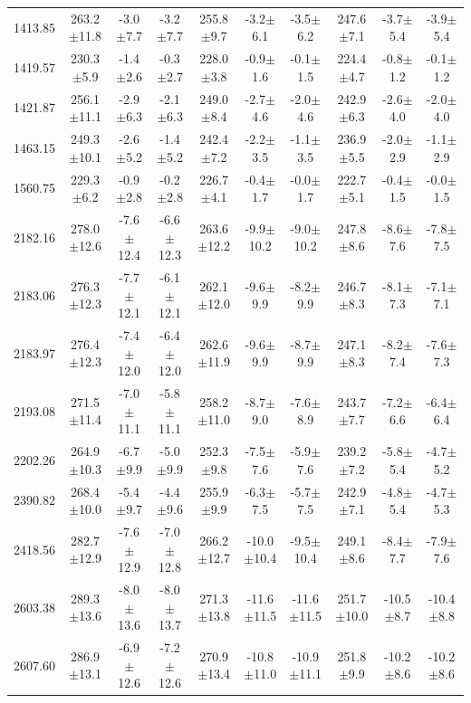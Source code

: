 \documentclass[agupp]{aguplus}              %
\begin{document}
\begin{article}
\begin{center}
\begin{table}[ht]
{\begin{tabular}{c|ccc|ccc|ccc}
1413.85 & 263.2$\pm$11.8 & -3.0$\pm$7.7 & -3.2$\pm$7.7 & 255.8$\pm$9.7 & -3.2$\pm$6.1 & -3.5$\pm$6.2 & 247.6$\pm$7.1 & -3.7$\pm$5.4 & -3.9$\pm$5.4 \\ 
1419.57 & 230.3$\pm$5.9 & -1.4$\pm$2.6 & -0.3$\pm$2.7 & 228.0$\pm$3.8 & -0.9$\pm$1.6 & -0.1$\pm$1.5 & 224.4$\pm$4.7 & -0.8$\pm$1.2 & -0.1$\pm$1.2 \\ 
1421.87 & 256.1$\pm$11.1 & -2.9$\pm$6.3 & -2.1$\pm$6.3 & 249.0$\pm$8.4 & -2.7$\pm$4.6 & -2.0$\pm$4.6 & 242.9$\pm$6.3 & -2.6$\pm$4.0 & -2.0$\pm$4.0 \\ 
1463.15 & 249.3$\pm$10.1 & -2.6$\pm$5.2 & -1.4$\pm$5.2 & 242.4$\pm$7.2 & -2.2$\pm$3.5 & -1.1$\pm$3.5 & 236.9$\pm$5.5 & -2.0$\pm$2.9 & -1.1$\pm$2.9 \\ 
1560.75 & 229.3$\pm$6.2 & -0.9$\pm$2.8 & -0.2$\pm$2.8 & 226.7$\pm$4.1 & -0.4$\pm$1.7 & -0.0$\pm$1.7 & 222.7$\pm$5.1 & -0.4$\pm$1.5 & -0.0$\pm$1.5 \\ 
\hline
2182.16 & 278.0$\pm$12.6 & -7.6$\pm$12.4 & -6.6$\pm$12.3 & 263.6$\pm$12.2 & -9.9$\pm$10.2 & -9.0$\pm$10.2 & 247.8$\pm$8.6 & -8.6$\pm$7.6 & -7.8$\pm$7.5 \\ 
2183.06 & 276.3$\pm$12.3 & -7.7$\pm$12.1 & -6.1$\pm$12.1 & 262.1$\pm$12.0 & -9.6$\pm$9.9 & -8.2$\pm$9.9 & 246.7$\pm$8.3 & -8.1$\pm$7.3 & -7.1$\pm$7.1 \\ 
2183.97 & 276.4$\pm$12.3 & -7.4$\pm$12.0 & -6.4$\pm$12.0 & 262.6$\pm$11.9 & -9.6$\pm$9.9 & -8.7$\pm$9.9 & 247.1$\pm$8.3 & -8.2$\pm$7.4 & -7.6$\pm$7.3 \\ 
2193.08 & 271.5$\pm$11.4 & -7.0$\pm$11.1 & -5.8$\pm$11.1 & 258.2$\pm$11.0 & -8.7$\pm$9.0 & -7.6$\pm$8.9 & 243.7$\pm$7.7 & -7.2$\pm$6.6 & -6.4$\pm$6.4 \\ 
2202.26 & 264.9$\pm$10.3 & -6.7$\pm$9.9 & -5.0$\pm$9.9 & 252.3$\pm$9.8 & -7.5$\pm$7.6 & -5.9$\pm$7.6 & 239.2$\pm$7.2 & -5.8$\pm$5.4 & -4.7$\pm$5.2 \\ 
2390.82 & 268.4$\pm$10.0 & -5.4$\pm$9.7 & -4.4$\pm$9.6 & 255.9$\pm$9.9 & -6.3$\pm$7.5 & -5.7$\pm$7.5 & 242.9$\pm$7.1 & -4.8$\pm$5.4 & -4.7$\pm$5.3 \\ 
\hline
2418.56 & 282.7$\pm$12.9 & -7.6$\pm$12.9 & -7.0$\pm$12.8 & 266.2$\pm$12.7 & -10.0$\pm$10.4 & -9.5$\pm$10.4 & 249.1$\pm$8.6 & -8.4$\pm$7.7 & -7.9$\pm$7.6 \\ 
2603.38 & 289.3$\pm$13.6 & -8.0$\pm$13.6 & -8.0$\pm$13.7 & 271.3$\pm$13.8 & -11.6$\pm$11.5 & -11.6$\pm$11.5 & 251.7$\pm$10.0 & -10.5$\pm$8.7 & -10.4$\pm$8.8 \\ 
2607.60 & 286.9$\pm$13.1 & -6.9$\pm$12.6 & -7.2$\pm$12.6 & 270.9$\pm$13.4 & -10.8$\pm$11.0 & -10.9$\pm$11.1 & 251.8$\pm$9.9 & -10.2$\pm$8.6 & -10.2$\pm$8.6 \\ 

\end{tabular}}
\end{table}
\end{center}
\end{article}
\end{document}
